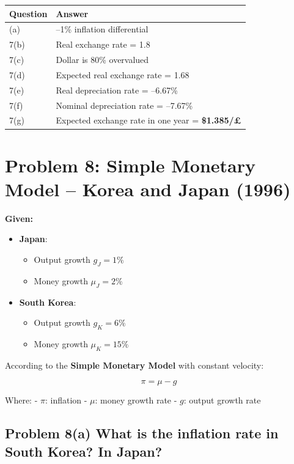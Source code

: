 \documentclass[
]{article}
\providecommand{\tightlist}{%
  \setlength{\itemsep}{0pt}\setlength{\parskip}{0pt}}
\begin{document}
\begin{longtable}[]{@{}ll@{}}
\toprule\noalign{}
Question & Answer \\
\midrule\noalign{}
\endhead
\bottomrule\noalign{}
\endlastfoot
7(a) & --1\% inflation differential \\
7(b) & Real exchange rate = 1.8 \\
7(c) & Dollar is 80\% overvalued \\
7(d) & Expected real exchange rate = 1.68 \\
7(e) & Real depreciation rate = --6.67\% \\
7(f) & Nominal depreciation rate = --7.67\% \\
7(g) & Expected exchange rate in one year = \textbf{\$1.385/£} \\
\end{longtable}

\section{Problem 8: Simple Monetary Model -- Korea and Japan
(1996)}\label{problem-8-simple-monetary-model-korea-and-japan-1996}

\textbf{Given:}

\begin{itemize}
\tightlist
\item
  \textbf{Japan}:

  \begin{itemize}
  \tightlist
  \item
    Output growth \(g_J = 1\%\)
  \item
    Money growth \(\mu_J = 2\%\)
  \end{itemize}
\item
  \textbf{South Korea}:

  \begin{itemize}
  \tightlist
  \item
    Output growth \(g_K = 6\%\)
  \item
    Money growth \(\mu_K = 15\%\)
  \end{itemize}
\end{itemize}

According to the \textbf{Simple Monetary Model} with constant velocity:

\[
\pi = \mu - g
\]

Where: - \(\pi\): inflation - \(\mu\): money growth rate - \(g\): output
growth rate

\subsection{Problem 8(a) What is the inflation rate in South Korea? In
Japan?}\label{problem-8a-what-is-the-inflation-rate-in-south-korea-in-japan}
\end{document}
